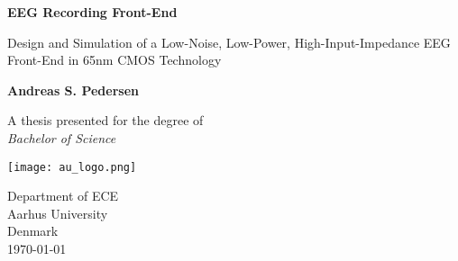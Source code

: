 \documentclass[../main.tex]{subfiles}
\begin{document}

\begin{titlepage}
    \begin{center}
        
        \vspace*{1cm}

        \textbf{\large{EEG Recording Front-End}}

        \vspace{0.5cm}
        Design and Simulation of a Low-Noise, Low-Power, High-Input-Impedance EEG Front-End in 65nm CMOS Technology

        \vspace{1.5cm}

        \textbf{Andreas S. Pedersen}

        \vfill

        A thesis presented for the degree of\\
        \textit{Bachelor of Science}

        \vspace{0.8cm}
        
        \texttt{[image: au\_logo.png]}

        \vspace*{1cm}

        Department of ECE\\
        Aarhus University\\
        Denmark\\
        \today
    \end{center}
\end{titlepage}
\end{document}
